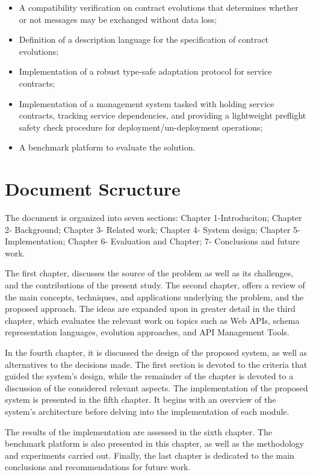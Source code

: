 \begin{itemize}
    \setlength\itemsep{0em}
    \item A compatibility verification on contract evolutions that determines whether or not messages may be exchanged without data loss;
    \item Definition of a description language for the specification of contract evolutions;
    \item Implementation of a robust type-safe adaptation protocol for service contracts;
    \item Implementation of a management system tasked with holding service contracts, tracking service dependencies,
    and providing a lightweight preflight safety check procedure for deployment/un-deployment operations;
    \item A benchmark platform to evaluate the solution.
\end{itemize}

\section{Document Scructure} %
\label{sec:document_structure}

The document is organized into seven sections: Chapter 1-Introduciton; Chapter 2-
Background; Chapter 3- Related work; Chapter 4- System design; Chapter 5- Implementation;
Chapter 6- Evaluation and Chapter; 7- Conclusions and future work.

The first chapter, discusses the source of the problem as well as its challenges,
and the contributions of the present study.
The second chapter, offers a review of the main concepts, techniques, and
applications underlying the problem, and the proposed approach.
The ideas are expanded upon in greater detail in the third chapter, which evaluates the relevant work on topics such as
Web APIs, schema representation languages, evolution approaches, and API Management Tools.

In the fourth chapter, it is discussed the design of the proposed system, as well
as alternatives to the decisions made.
The first section is devoted to the
criteria that guided the system's design, while the remainder of the chapter is devoted to a
discussion of the considered relevant aspects.
The implementation of the proposed system is presented in the fifth chapter.
It begins with an overview of the system's architecture before delving into the implementation of each module.

The results of the implementation are assessed in the sixth chapter.
The benchmark platform is also presented in this chapter, as well as the methodology and experiments carried out.
Finally, the last chapter is dedicated to the main conclusions and recommendations for future
work.

